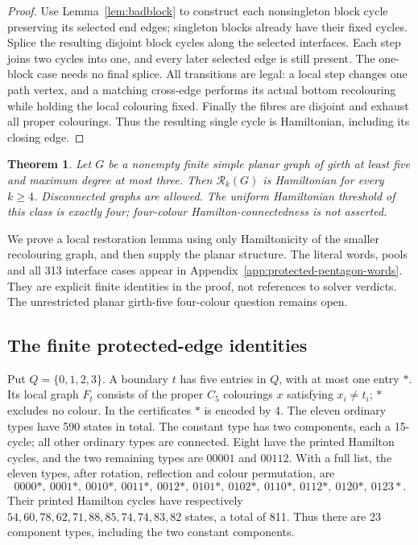 \documentclass[11pt]{article}
\newtheorem{theorem}{Theorem}[section]
\theoremstyle{remark}
\newcommand{\Rk}{\mathcal R_k}
\numberwithin{equation}{section}
\numberwithin{table}{section}
\begin{document}
\begin{proof}
Use Lemma~\ref{lem:badblock} to construct each nonsingleton block
cycle preserving its selected end edges; singleton blocks already
have their fixed cycles. Splice the resulting disjoint block cycles
along the selected interfaces. Each step joins two cycles into one,
and every later selected edge is still present. The one-block case
needs no final splice. All transitions are legal: a local step changes
one path vertex, and a matching cross-edge performs its actual bottom
recolouring while holding the local colouring fixed. Finally the fibres
are disjoint and exhaust all proper colourings. Thus the resulting
single cycle is Hamiltonian, including its closing edge.
\end{proof}



\begin{theorem}\label{thm:subcubic}
Let $G$ be a nonempty finite simple planar graph of girth at least five
and maximum degree at most three. Then $\Rk(G)$ is Hamiltonian for
every $k\ge4$. Disconnected graphs are allowed. The uniform Hamiltonian threshold
of this class is exactly four; four-colour Hamilton-connectedness is not asserted.
\end{theorem}

We prove a local restoration lemma using only Hamiltonicity of the
smaller recolouring graph, and then supply the planar structure.
The literal words, pools and all 313 interface cases appear in
Appendix~\ref{app:protected-pentagon-words}. They are explicit finite
identities in the proof, not references to solver verdicts.
The unrestricted planar girth-five four-colour question remains open.

\subsection{The finite protected-edge identities}
Put $Q=\{0,1,2,3\}$. A boundary $t$ has five entries in $Q$, with at most
one entry $\ast$. Its local graph $F_t$ consists of the proper $C_5$
colourings $x$ satisfying $x_i\ne t_i$; $\ast$ excludes no colour.
In the certificates $\ast$ is encoded by 4.
The eleven ordinary types have 590 states in total.
The constant type has two components, each a 15-cycle; all other
ordinary types are connected. Eight have the printed Hamilton cycles,
and the two remaining types are $00001$ and $00112$.
With a full list, the eleven types, after rotation, reflection and
colour permutation, are
\[
0000\ast,\ 0001\ast,\ 0010\ast,\ 0011\ast,\ 0012\ast,\
0101\ast,\ 0102\ast,\ 0110\ast,\ 0112\ast,\ 0120\ast,\ 0123\ast.
\]
Their printed Hamilton cycles have respectively
$54,60,78,62,71,88,85,74,74,83,82$ states, a total of 811.
Thus there are 23 component types, including the two constant components.
\end{document}
